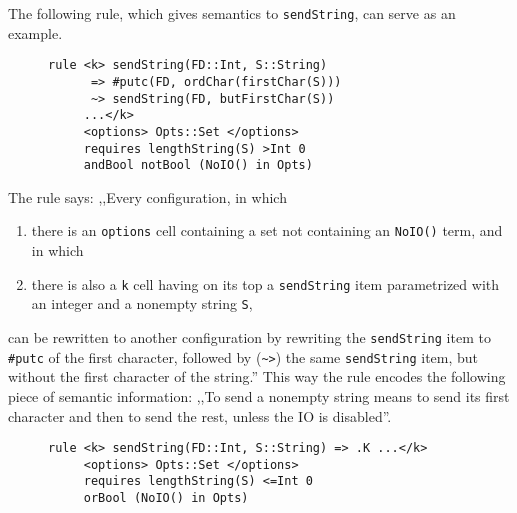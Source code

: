 \documentclass{fithesis3}
\begin{document}
The following rule, which gives semantics to \texttt{sendString}, can serve as an example.
\begin{figure}[h]
\begin{lstlisting}
rule <k> sendString(FD::Int, S::String)
      => #putc(FD, ordChar(firstChar(S)))
      ~> sendString(FD, butFirstChar(S))
     ...</k>
     <options> Opts::Set </options>
     requires lengthString(S) >Int 0
     andBool notBool (NoIO() in Opts)
\end{lstlisting}
\end{figure}

The rule says: ,,Every configuration, in which
\begin{enumerate}
\item there is an \texttt{options} cell containing a set not containing an \texttt{NoIO()} term, and in which
\item there is also a \texttt{k} cell having on its top a \texttt{sendString} item parametrized with an integer and a nonempty string \texttt{S},
\end{enumerate}
can be rewritten to another configuration by rewriting the \texttt{sendString} item to \texttt{\#putc} of the first character, followed by (\lstinline{~>}) the same \texttt{sendString} item, but without the first character of the string.''
This way the rule encodes the following piece of semantic information: ,,To send a nonempty string means to send its first character and then to send the rest, unless the IO is disabled''.


%
%
%


\begin{figure}
\begin{lstlisting}
rule <k> sendString(FD::Int, S::String) => .K ...</k>
     <options> Opts::Set </options>
     requires lengthString(S) <=Int 0
     orBool (NoIO() in Opts)
\end{lstlisting}
\end{figure}
\end{document}
